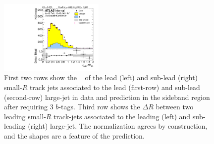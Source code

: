 \begin{figure}[htbp!]
\begin{center}
\includegraphics[width=0.45\textwidth,angle=-90]{figures/boosted/Sideband/b77_ThreeTag_Sideband_sublHCand_trk_dr.pdf}
  \caption{First two rows show the \pt~ of the lead (left) and sub-lead (right) small-$R$ track jets associated to the lead (first-row) and sub-lead (second-row) large-\R jet in data and prediction in the sideband region after requiring 3 $b$-tags. Third row shows the $\Delta R$ between two leading small-$R$ track-jets associated to the leading (left) and sub-leading (right) large-\R jet. The normalization agrees by construction, and the shapes are a feature of the prediction. }
  \label{fig:boosted-3b-sideband-ak2}
\end{center}
\end{figure}


